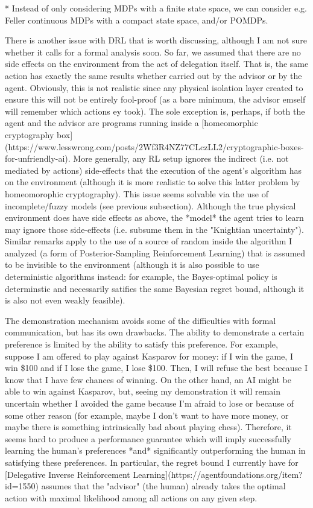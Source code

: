 \documentclass[a4paper]{article}
\begin{document}
* Instead of only considering MDPs with a finite state space, we can consider e.g. Feller continuous MDPs with a compact state space, and/or POMDPs.

There is another issue with DRL that is worth discussing, although I am not sure whether it calls for a formal analysis soon. So far, we assumed that there are no side effects on the environment from the act of delegation itself. That is, the same action has exactly the same results whether carried out by the advisor or by the agent. Obviously, this is not realistic since any physical isolation layer created to ensure this will not be entirely fool-proof (as a bare minimum, the advisor emself will remember which actions ey took). The sole exception is, perhaps, if both the agent and the advisor are programs running inside a [homeomorphic cryptography box](https://www.lesswrong.com/posts/2Wf3R4NZ77CLczLL2/cryptographic-boxes-for-unfriendly-ai). More generally, any RL setup ignores the indirect (i.e. not mediated by actions) side-effects that the execution of the agent's algorithm has on the environment (although it is more realistic to solve this latter problem by homeomorophic cryptography). This issue seems solvable via the use of incomplete/fuzzy models (see previous subsection). Although the true physical environment does have side effects as above, the *model* the agent tries to learn may ignore those side-effects (i.e. subsume them in the "Knightian uncertainty"). Similar remarks apply to the use of a source of random inside the algorithm I analyzed (a form of Posterior-Sampling Reinforcement Learning) that is assumed to be invisible to the environment (although it is also possible to use deterministic algorithms instead: for example, the Bayes-optimal policy is determinstic and necessarily satifies the same Bayesian regret bound, although it is also not even weakly feasible).

The demonstration mechanism avoids some of the difficulties with formal communication, but has its own drawbacks. The ability to demonstrate a certain preference is limited by the ability to satisfy this preference. For example, suppose I am offered to play against Kasparov for money: if I win the game, I win \$100 and if I lose the game, I lose \$100. Then, I will refuse the best because I know that I have few chances of winning. On the other hand, an AI might be able to win against Kasparov, but, seeing my demonstration it will remain uncertain whether I avoided the game because I'm afraid to lose or because of some other reason (for example, maybe I don't want to have more money, or maybe there is something intrinsically bad about playing chess). Therefore, it seems hard to produce a performance guarantee which will imply successfully learning the human's preferences *and* significantly outperforming the human in satisfying these preferences. In particular, the regret bound I currently have for [Delegative Inverse Reinforcement Learning](https://agentfoundations.org/item?id=1550) assumes that the "advisor" (the human) already takes the optimal action with maximal likelihood among all actions on any given step.
\end{document}
